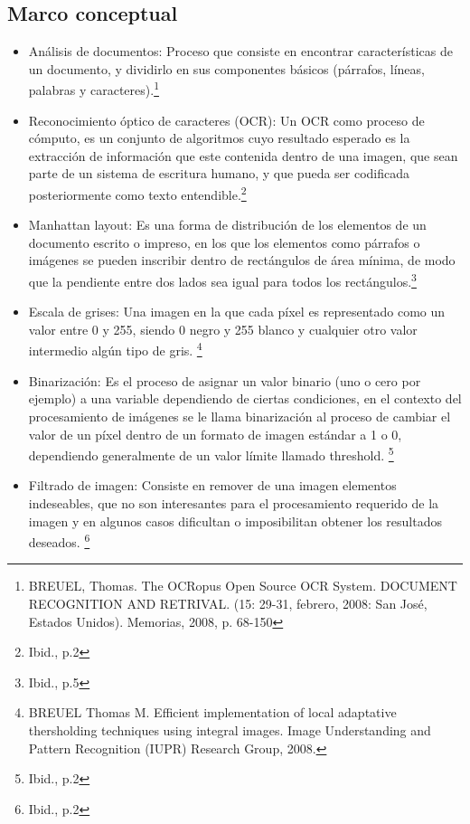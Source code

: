 \documentclass[a4paper, 11pt, oneside]{article}
\begin{document}
	\subsection{Marco conceptual}
	\begin{itemize}
    \item Análisis de documentos: Proceso que consiste en encontrar características de un documento,
    y dividirlo en sus componentes básicos (párrafos, líneas, palabras y caracteres).\footnote{BREUEL,
    Thomas. The OCRopus Open Source OCR System. DOCUMENT RECOGNITION AND RETRIVAL. (15: 29-31, febrero,
    2008: San José, Estados Unidos). Memorias, 2008, p. 68-150}
    \item Reconocimiento óptico de caracteres (OCR): Un OCR como proceso de cómputo, es un conjunto de
    algoritmos cuyo resultado esperado es la extracción de información  que este contenida dentro de
    una imagen, que sean parte de un sistema de escritura humano, y que pueda ser codificada
    posteriormente como texto entendible.\footnote{Ibid., p.2}
    \item Manhattan layout: Es una forma de distribución de los elementos de un documento escrito o
    impreso, en los que los elementos como párrafos o imágenes se pueden inscribir
    dentro de rectángulos de área mínima, de modo que la pendiente entre dos lados sea igual para
    todos los rectángulos.\footnote{Ibid., p.5}
    \item Escala de grises: Una imagen en la que cada píxel es representado como un valor entre 0 y
    255, siendo 0 negro y 255 blanco y cualquier otro valor intermedio algún tipo de gris. \footnote{
    BREUEL Thomas M. Efficient implementation of local adaptative thersholding techniques using integral 
    images. Image Understanding and Pattern Recognition (IUPR) Research Group, 2008.}
    \item Binarización:	Es el proceso de asignar un valor binario (uno o cero por ejemplo) a una
    variable dependiendo de	ciertas condiciones, en el contexto del procesamiento de imágenes se le
    llama binarización al proceso de cambiar el valor de un píxel dentro de un formato de imagen
    estándar a 1 o 0, dependiendo generalmente de un valor límite llamado threshold.
    \footnote{Ibid., p.2}
    \item Filtrado de imagen: Consiste en remover de una imagen elementos indeseables, que no
    son interesantes para el procesamiento requerido de la imagen y en algunos casos dificultan
    o imposibilitan obtener los resultados deseados.
    \footnote{Ibid., p.2}

\end{itemize}
\end{document}

